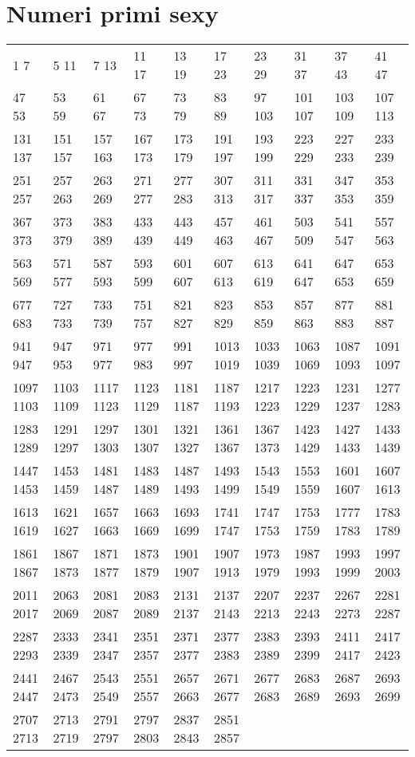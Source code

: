 \section{Numeri primi sexy}
\begin{center}
 \footnotesize
 \begin{tabular}{*{10}{l}}
  \toprule 
1 7 & 5 11 & 7 13 & 11 17 & 13 19 & 17 23 & 23 29 & 31 37 & 37 43 & 41 47\\
47 53 & 53 59 & 61 67 & 67 73 & 73 79 & 83 89 & 97 103 & 101 107 & 103 109 & 107 113\\
131 137 & 151 157 & 157 163 & 167 173 & 173 179 & 191 197 & 193 199 & 223 229 & 227 233 & 233 239\\
251 257 & 257 263 & 263 269 & 271 277 & 277 283 & 307 313 & 311 317 & 331 337 & 347 353 & 353 359\\
367 373 & 373 379 & 383 389 & 433 439 & 443 449 & 457 463 & 461 467 & 503 509 & 541 547 & 557 563\\
563 569 & 571 577 & 587 593 & 593 599 & 601 607 & 607 613 & 613 619 & 641 647 & 647 653 & 653 659\\
677 683 & 727 733 & 733 739 & 751 757 & 821 827 & 823 829 & 853 859 & 857 863 & 877 883 & 881 887\\
941 947 & 947 953 & 971 977 & 977 983 & 991 997 & 1013 1019 & 1033 1039 & 1063 1069 & 1087 1093 & 1091 1097\\
1097 1103 & 1103 1109 & 1117 1123 & 1123 1129 & 1181 1187 & 1187 1193 & 1217 1223 & 1223 1229 & 1231 1237 & 1277 1283\\
1283 1289 & 1291 1297 & 1297 1303 & 1301 1307 & 1321 1327 & 1361 1367 & 1367 1373 & 1423 1429 & 1427 1433 & 1433 1439\\
1447 1453 & 1453 1459 & 1481 1487 & 1483 1489 & 1487 1493 & 1493 1499 & 1543 1549 & 1553 1559 & 1601 1607 & 1607 1613\\
1613 1619 & 1621 1627 & 1657 1663 & 1663 1669 & 1693 1699 & 1741 1747 & 1747 1753 & 1753 1759 & 1777 1783 & 1783 1789\\
1861 1867 & 1867 1873 & 1871 1877 & 1873 1879 & 1901 1907 & 1907 1913 & 1973 1979 & 1987 1993 & 1993 1999 & 1997 2003\\
2011 2017 & 2063 2069 & 2081 2087 & 2083 2089 & 2131 2137 & 2137 2143 & 2207 2213 & 2237 2243 & 2267 2273 & 2281 2287\\
2287 2293 & 2333 2339 & 2341 2347 & 2351 2357 & 2371 2377 & 2377 2383 & 2383 2389 & 2393 2399 & 2411 2417 & 2417 2423\\
2441 2447 & 2467 2473 & 2543 2549 & 2551 2557 & 2657 2663 & 2671 2677 & 2677 2683 & 2683 2689 & 2687 2693 & 2693 2699\\
2707 2713 & 2713 2719 & 2791 2797 & 2797 2803 & 2837 2843 & 2851 2857 \\ 
  \bottomrule
 \end{tabular}
\end{center}
